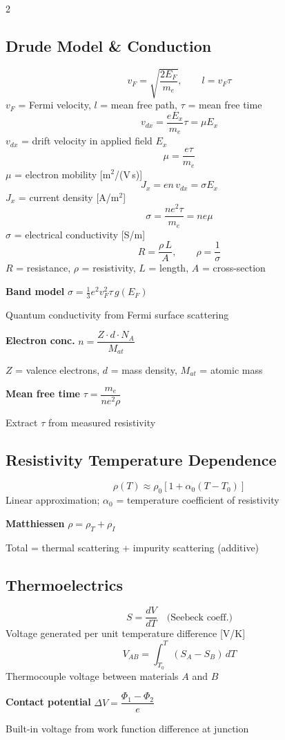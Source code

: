 \documentclass[9pt]{extarticle}
\newcommand{\eqlabel}[1]{\textbf{\scriptsize #1}\;}
\newcommand{\desc}[1]{{\small\color{desc}#1}}
\begin{document}
\begin{multicols}{2}
\subsection{Drude Model \& Conduction}
\[v_F = \sqrt{\frac{2E_F}{m_e}},\qquad l = v_F\tau\]
\desc{$v_F$ = Fermi velocity, $l$ = mean free path, $\tau$ = mean free time}
\[v_{dx} = \frac{eE_x}{m_e}\tau = \mu E_x\]
\desc{$v_{dx}$ = drift velocity in applied field $E_x$}
\[\mu = \frac{e\tau}{m_e}\]
\desc{$\mu$ = electron mobility [m$^2$/(V\,s)]}
\[J_x = en\,v_{dx} = \sigma E_x\]
\desc{$J_x$ = current density [A/m$^2$]}
\[\sigma = \frac{ne^2\tau}{m_e} = ne\mu\]
\desc{$\sigma$ = electrical conductivity [S/m]}
\[R = \frac{\rho\,L}{A},\qquad \rho = \frac{1}{\sigma}\]
\desc{$R$ = resistance, $\rho$ = resistivity, $L$ = length, $A$ = cross-section}

\eqlabel{Band model} $\sigma = \tfrac{1}{3}e^2v_F^2\tau\,g(E_F)$

\desc{Quantum conductivity from Fermi surface scattering}

\eqlabel{Electron conc.} $n = \dfrac{Z\cdot d\cdot N_A}{M_{at}}$

\desc{$Z$ = valence electrons, $d$ = mass density, $M_{at}$ = atomic mass}

\eqlabel{Mean free time} $\tau = \dfrac{m_e}{ne^2\rho}$

\desc{Extract $\tau$ from measured resistivity}

\subsection{Resistivity Temperature Dependence}
\[\rho(T) \approx \rho_0[1 + \alpha_0(T - T_0)]\]
\desc{Linear approximation; $\alpha_0$ = temperature coefficient of resistivity}

\eqlabel{Matthiessen} $\rho = \rho_T + \rho_I$

\desc{Total = thermal scattering + impurity scattering (additive)}

\subsection{Thermoelectrics}
\[S = \frac{dV}{dT} \quad\text{(Seebeck coeff.)}\]
\desc{Voltage generated per unit temperature difference [V/K]}
\[V_{AB} = \int_{T_0}^{T}(S_A - S_B)\,dT\]
\desc{Thermocouple voltage between materials $A$ and $B$}

\eqlabel{Contact potential} $\Delta V = \dfrac{\Phi_1 - \Phi_2}{e}$

\desc{Built-in voltage from work function difference at junction}


\end{multicols}
\end{document}
